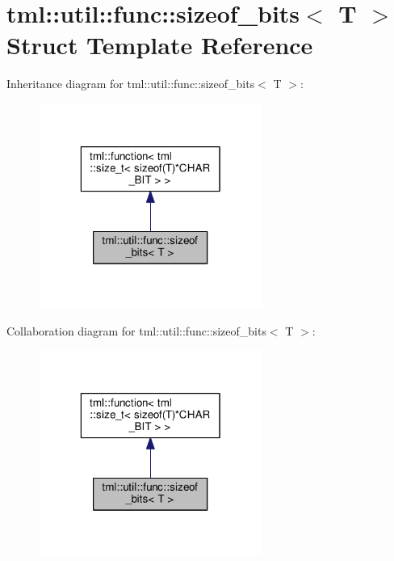 \hypertarget{structtml_1_1util_1_1func_1_1sizeof__bits}{\section{tml\+:\+:util\+:\+:func\+:\+:sizeof\+\_\+bits$<$ T $>$ Struct Template Reference}
\label{structtml_1_1util_1_1func_1_1sizeof__bits}
}


Inheritance diagram for tml\+:\+:util\+:\+:func\+:\+:sizeof\+\_\+bits$<$ T $>$\+:
\nopagebreak
\begin{figure}[H]
\begin{center}
\leavevmode
\includegraphics[width=208pt]{structtml_1_1util_1_1func_1_1sizeof__bits__inherit__graph}
\end{center}
\end{figure}


Collaboration diagram for tml\+:\+:util\+:\+:func\+:\+:sizeof\+\_\+bits$<$ T $>$\+:
\nopagebreak
\begin{figure}[H]
\begin{center}
\leavevmode
\includegraphics[width=208pt]{structtml_1_1util_1_1func_1_1sizeof__bits__coll__graph}
\end{center}
\end{figure}
